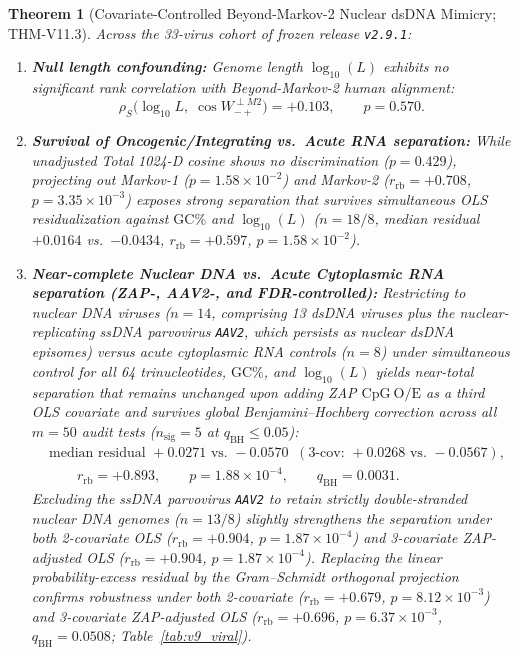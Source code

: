 \documentclass[11pt, a4paper]{article}
\newtheorem{theorem}{Theorem}[section]
\DeclareRobustCommand{\_}{\textunderscore\allowbreak}
\begin{document}
\begin{theorem}[Covariate-Controlled Beyond-Markov-2 Nuclear dsDNA Mimicry; THM-V11.3]
\label{thm:v11_3}
Across the 33-virus cohort of frozen release \texttt{v2.9.1}:
\begin{enumerate}
    \item \textbf{Null length confounding:} Genome length $\log_{10}(L)$ exhibits no significant rank correlation with Beyond-Markov-2 human alignment:
    \begin{equation}
        \rho_S\bigl(\log_{10} L,\; \cos W_{-+}^{\perp M2}\bigr) = +0.103, \qquad p = 0.570.
    \end{equation}
    \item \textbf{Survival of Oncogenic/Integrating vs.\ Acute RNA separation:} While unadjusted Total 1024-D cosine shows no discrimination ($p = 0.429$), projecting out Markov-1 ($p = 1.58 \times 10^{-2}$) and Markov-2 ($r_{\mathrm{rb}} = +0.708$, $p = 3.35 \times 10^{-3}$) exposes strong separation that survives simultaneous OLS residualization against $\mathrm{GC}\%$ and $\log_{10}(L)$ ($n = 18/8$, median residual $+0.0164$ vs.\ $-0.0434$, $r_{\mathrm{rb}} = +0.597$, $p = 1.58 \times 10^{-2}$).
    \item \textbf{Near-complete Nuclear DNA vs.\ Acute Cytoplasmic RNA separation (ZAP-, AAV2-, and FDR-controlled):} Restricting to nuclear DNA viruses ($n = 14$, comprising 13 dsDNA viruses plus the nuclear-replicating ssDNA parvovirus \texttt{AAV2}, which persists as nuclear dsDNA episomes) versus acute cytoplasmic RNA controls ($n = 8$) under simultaneous control for all 64 trinucleotides, $\mathrm{GC}\%$, and $\log_{10}(L)$ yields near-total separation that remains unchanged upon adding ZAP $\mathrm{CpG\ O/E}$ as a third OLS covariate and survives global Benjamini--Hochberg correction across all $m = 50$ audit tests ($n_{\mathrm{sig}} = 5$ at $q_{\mathrm{BH}} \le 0.05$):
    \begin{equation}
    \begin{aligned}
        &\text{median residual } +0.0271 \text{ vs.\ } -0.0570\;\;(\text{3-cov: } +0.0268 \text{ vs.\ } -0.0567), \\
        &\qquad r_{\mathrm{rb}} = +0.893, \qquad p = 1.88 \times 10^{-4}, \qquad q_{\mathrm{BH}} = 0.0031.
    \end{aligned}
    \end{equation}
    Excluding the ssDNA parvovirus \texttt{AAV2} to retain strictly double-stranded nuclear DNA genomes ($n = 13/8$) slightly strengthens the separation under both 2-covariate OLS ($r_{\mathrm{rb}} = +0.904$, $p = 1.87 \times 10^{-4}$) and 3-covariate ZAP-adjusted OLS ($r_{\mathrm{rb}} = +0.904$, $p = 1.87 \times 10^{-4}$). Replacing the linear probability-excess residual by the Gram--Schmidt orthogonal projection confirms robustness under both 2-covariate ($r_{\mathrm{rb}} = +0.679$, $p = 8.12 \times 10^{-3}$) and 3-covariate ZAP-adjusted OLS ($r_{\mathrm{rb}} = +0.696$, $p = 6.37 \times 10^{-3}$, $q_{\mathrm{BH}} = 0.0508$; Table~\ref{tab:v9_viral}).
\end{enumerate}
\end{theorem}
\end{document}
